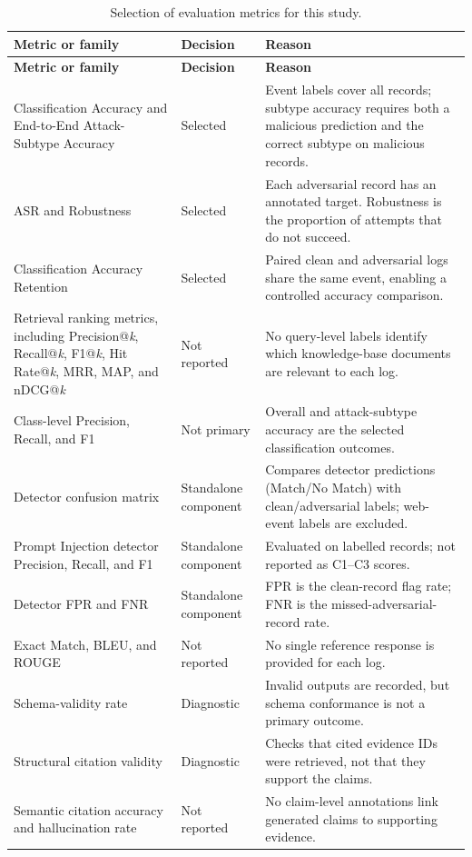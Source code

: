 {\small
\setlength{\tabcolsep}{4pt}
\renewcommand{\arraystretch}{1.15}
\begin{longtable}{@{}p{}p{}p{}@{}}
\caption{Selection of evaluation metrics for this study.}
\label{tab:metric-selection}\\
\toprule
\textbf{Metric or family} & \textbf{Decision} & \textbf{Reason} \\
\midrule
\endfirsthead
\toprule
\textbf{Metric or family} & \textbf{Decision} & \textbf{Reason} \\
\midrule
\endhead
\bottomrule
\endlastfoot
Classification Accuracy and End-to-End Attack-Subtype Accuracy & Selected & Event labels cover all records; subtype accuracy requires both a malicious prediction and the correct subtype on malicious records. \\
ASR and Robustness & Selected & Each adversarial record has an annotated target. Robustness is the proportion of attempts that do not succeed. \\
Classification Accuracy Retention & Selected & Paired clean and adversarial logs share the same event, enabling a controlled accuracy comparison. \\
Retrieval ranking metrics, including Precision@\emph{k}, Recall@\emph{k}, F1@\emph{k}, Hit Rate@\emph{k}, MRR, MAP, and nDCG@\emph{k} & Not reported & No query-level labels identify which knowledge-base documents are relevant to each log. \\
Class-level Precision, Recall, and F1 & Not primary & Overall and attack-subtype accuracy are the selected classification outcomes. \\
Detector confusion matrix & Standalone component & Compares detector predictions (Match/No Match) with clean/adversarial labels; web-event labels are excluded. \\
Prompt Injection detector Precision, Recall, and F1 & Standalone component & Evaluated on labelled records; not reported as C1--C3 scores. \\
Detector FPR and FNR & Standalone component & FPR is the clean-record flag rate; FNR is the missed-adversarial-record rate. \\
Exact Match, BLEU, and ROUGE & Not reported & No single reference response is provided for each log. \\
Schema-validity rate & Diagnostic & Invalid outputs are recorded, but schema conformance is not a primary outcome. \\
Structural citation validity & Diagnostic & Checks that cited evidence IDs were retrieved, not that they support the claims. \\
Semantic citation accuracy and hallucination rate & Not reported & No claim-level annotations link generated claims to supporting evidence. \\
\end{longtable}
}

